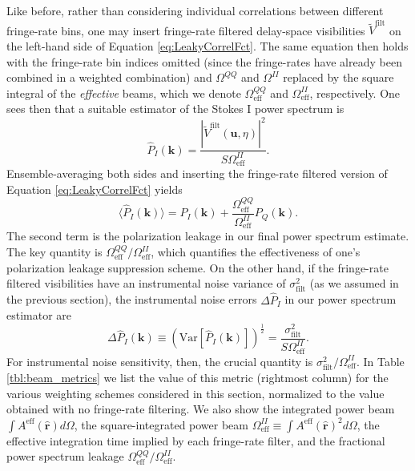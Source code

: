 \documentclass[twocolumn,apj,numberedappendix]{emulateapj}
\newcommand{\rhat}{\hat{\mathbf{r}}}
\begin{document}
Like before, rather than considering individual correlations between different fringe-rate bins, one may
insert fringe-rate filtered delay-space visibilities $\widetilde{V}^\textrm{filt} $ on the left-hand side of Equation \eqref{eq:LeakyCorrelFct}. The
same equation then holds with the fringe-rate bin indices omitted (since the fringe-rates have already
been combined in a weighted combination) and $\Omega^{QQ}$ and $\Omega^{II}$ replaced
by the square integral of the \emph{effective} beams, which we denote $\Omega^{QQ}_\textrm{eff}$ and $\Omega^{II}_\textrm{eff}$, respectively. One sees then that a suitable estimator of
the Stokes I power spectrum is
\begin{equation}
\widehat{P}_I (\mathbf{k}) =\frac{ | \widetilde{V}^\textrm{filt} (\mathbf{u}, \eta) |^2}{S \Omega^{II}_\textrm{eff}}.
\end{equation}
Ensemble-averaging both sides and inserting the fringe-rate filtered version of Equation \eqref{eq:LeakyCorrelFct} yields
\begin{equation}
\langle \widehat{P}_I (\mathbf{k}) \rangle = P_I (\mathbf{k}) + \frac{\Omega^{QQ}_\textrm{eff}}{\Omega^{II}_\textrm{eff}} P_Q (\mathbf{k}).
\end{equation}
The second term is the polarization leakage in our final power spectrum estimate. The key quantity is $\Omega^{QQ}_\textrm{eff}/\Omega^{II}_\textrm{eff}$, which quantifies the effectiveness of
one's polarization leakage suppression scheme. On the other hand, if the fringe-rate filtered
visibilities have an instrumental noise variance of $\sigma^2_\textrm{filt}$ (as we assumed in the previous section),
the instrumental noise errors $\Delta \widehat{P}_I$ in our power spectrum estimator are
\begin{equation}
\Delta \widehat{P}_I (\mathbf{k}) \equiv \left(\textrm{Var} \left[\widehat{P}_I (\mathbf{k}) \right]\right)^\frac{1}{2} = \frac{\sigma^2_\textrm{filt}}{S\Omega^{II}_\textrm{eff}}.
\end{equation}
For instrumental noise sensitivity, then, the crucial quantity is $\sigma^2_\textrm{filt} / \Omega^{II}_\textrm{eff}$. In Table \ref{tbl:beam_metrics} we list the value of this metric
(rightmost column) for the various weighting schemes considered in this section, normalized to the value
obtained with no fringe-rate filtering. We also show the integrated power beam $\int A^\textrm{eff} (\rhat) d\Omega$, the
square-integrated power beam $\Omega^{II}_\textrm{eff} \equiv \int A^\textrm{eff} (\rhat)^2 d\Omega$, the
effective integration time implied by each fringe-rate filter, and the fractional power spectrum
leakage $\Omega^{QQ}_\textrm{eff}/\Omega^{II}_\textrm{eff}$.
\end{document}
